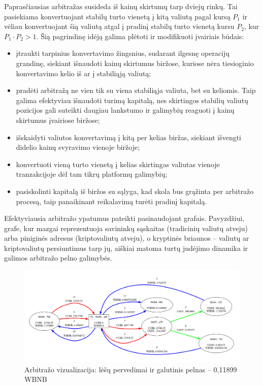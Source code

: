 \documentclass[]{VUMIFTemplateClass}
\begin{document}
Paprasčiausias arbitražas susideda iš kainų skirtumų tarp dviejų rinkų. Tai pasiekiama konvertuojant stabilų turto vienetą į kitą valiutą pagal kursą $P_1$ ir vėliau konvertuojant šią valiutą atgal į pradinį stabilų turto vienetą kursu $P_2$, kur $P_1 \cdot P_2 > 1$. Šią pagrindinę idėją galima plėtoti ir modifikuoti įvairiais būdais:

\begin{itemize}
    \item įtraukti tarpinius konvertavimo žingsnius, sudarant ilgesnę operacijų grandinę, siekiant išnaudoti kainų skirtumus biržose, kuriose nėra tiesioginio konvertavimo kelio iš ar į stabiliąją valiutą;
    \item pradėti arbitražą ne vien tik su viena stabiliąja valiuta, bet su keliomis. Taip galima efektyviau išnaudoti turimą kapitalą, nes skirtingos stabilių valiutų pozicijos gali suteikti daugiau lankstumo ir galimybių reaguoti į kainų skirtumus įvairiose biržose;
    \item išskaidyti valiutos konvertavimą į kitą per kelias biržas, siekiant išvengti didelio kainų svyravimo vienoje biržoje;
    \item konvertuoti vieną turto vienetą į kelias skirtingas valiutas vienoje tranzakcijoje dėl tam tikrų platformų galimybių;
    \item pasiskolinti kapitalą iš biržos su sąlyga, kad skola bus grąžinta per arbitražo procesą, taip panaikinant reikalavimą turėti pradinį kapitalą.
\end{itemize}

Efektyviausia arbitražo ypatumus pateikti pasinaudojant grafais. Pavyzdžiui, grafe, kur mazgai reprezentuoja savininkų sąskaitas (tradicinių valiutų atveju) arba piniginės adresus (kriptovaliutų atveju), o kryptinės briaunos – valiutų ar kriptovaliutų persiuntimus tarp jų, aiškiai matoma turtų judėjimo dinamika ir galimos arbitražo pelno galimybės. 

\begin{figure}[H]
    \centering
    \includegraphics[scale=0.3]{img/arb1.png}
    \caption{Arbitražo vizualizacija: lėšų pervedimai ir galutinis pelnas – 0,11899 WBNB}
    \label{img:chess-minimax-2}
\end{figure} 
\end{document}

